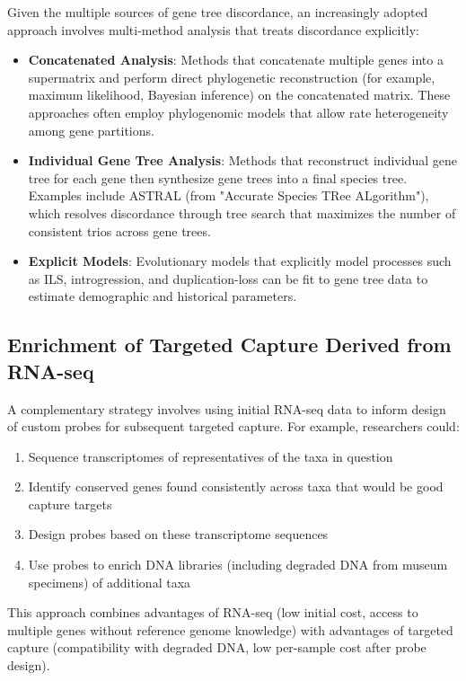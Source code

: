 Given the multiple sources of gene tree discordance, an increasingly adopted approach involves multi-method analysis that treats discordance explicitly:

\begin{itemize}
\item \textbf{Concatenated Analysis}: Methods that concatenate multiple genes into a supermatrix and perform direct phylogenetic reconstruction (for example, maximum likelihood, Bayesian inference) on the concatenated matrix. These approaches often employ phylogenomic models that allow rate heterogeneity among gene partitions.

\item \textbf{Individual Gene Tree Analysis}: Methods that reconstruct individual gene tree for each gene then synthesize gene trees into a final species tree. Examples include ASTRAL (from "Accurate Species TRee ALgorithm"), which resolves discordance through tree search that maximizes the number of consistent trios across gene trees.

\item \textbf{Explicit Models}: Evolutionary models that explicitly model processes such as ILS, introgression, and duplication-loss can be fit to gene tree data to estimate demographic and historical parameters.
\end{itemize}

\subsection{Enrichment of Targeted Capture Derived from RNA-seq}

A complementary strategy involves using initial RNA-seq data to inform design of custom probes for subsequent targeted capture. For example, researchers could:

\begin{enumerate}
\item Sequence transcriptomes of representatives of the taxa in question
\item Identify conserved genes found consistently across taxa that would be good capture targets
\item Design probes based on these transcriptome sequences
\item Use probes to enrich DNA libraries (including degraded DNA from museum specimens) of additional taxa
\end{enumerate}

This approach combines advantages of RNA-seq (low initial cost, access to multiple genes without reference genome knowledge) with advantages of targeted capture (compatibility with degraded DNA, low per-sample cost after probe design).

